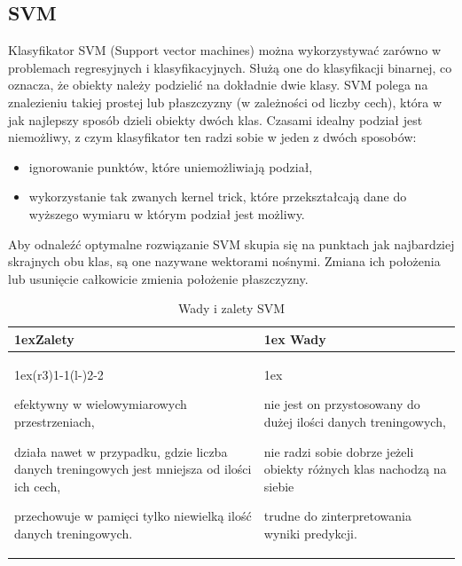 \subsection{SVM}

Klasyfikator SVM (Support vector machines) można wykorzystywać zarówno 
w problemach regresyjnych i klasyfikacyjnych. Służą one do klasyfikacji binarnej, co 
oznacza, że obiekty należy podzielić na dokładnie dwie klasy. SVM polega na znalezieniu
takiej prostej lub płaszczyzny (w zależności od liczby cech), która w jak najlepszy sposób
dzieli obiekty dwóch klas. Czasami idealny podział jest niemożliwy, z czym klasyfikator 
ten radzi sobie w jeden z dwóch sposobów:
\begin{itemize}
    \item ignorowanie punktów, które uniemożliwiają podział,
    \item wykorzystanie tak zwanych kernel trick, które przekształcają dane do wyższego 
    wymiaru w którym podział jest możliwy.
\end{itemize}
Aby odnaleźć optymalne rozwiązanie SVM skupia się na punktach jak najbardziej skrajnych
obu klas, są one nazywane wektorami nośnymi. Zmiana ich położenia lub usunięcie
całkowicie zmienia położenie płaszczyzny.

\begin{table}[h]
    \begin{tabularx}{\linewidth}{>{\parskip1ex}X@{\kern4\tabcolsep}>{\parskip1ex}X}
    \toprule
    \hfil\bfseries Zalety
    &
    \hfil\bfseries Wady
    \\\cmidrule(r{3\tabcolsep}){1-1}\cmidrule(l{-\tabcolsep}){2-2}
    
    efektywny w wielowymiarowych przestrzeniach,\par
    działa nawet w przypadku, gdzie liczba danych treningowych jest mniejsza od
    ilości ich cech,\par
    przechowuje w pamięci tylko niewielką ilość danych treningowych.\par
    
    &
    
    nie jest on przystosowany do dużej ilości danych treningowych,\par
    nie radzi sobie dobrze jeżeli obiekty różnych klas nachodzą na siebie\par
    trudne do zinterpretowania wyniki predykcji.
    
    \\\bottomrule
    \end{tabularx}
    \caption{Wady i zalety SVM}
\end{table}

